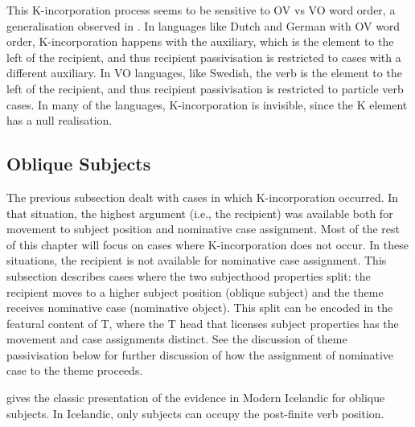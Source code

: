 {This K-incorporation process seems to be sensitive to OV vs VO word order, a generalisation observed in \cite{Sprouse.1995}. In languages like Dutch and German with OV word order, K-incorporation happens with the auxiliary, which is the element to the left of the recipient, and thus recipient passivisation is restricted to cases with a different auxiliary. In VO languages, like Swedish, the verb is the element to the left of the recipient, and thus recipient passivisation is restricted to particle verb cases. In many of the languages, K-incorporation is invisible, since the K element has a null realisation.

\subsection{Oblique Subjects}
The previous subsection dealt with cases in which K-incorporation occurred. In that situation, the highest argument (i.e., the recipient) was available both for movement to subject position and nominative case assignment. Most of the rest of this chapter will focus on cases where K-incorporation does not occur. In these situations, the recipient is not available for nominative case assignment. This subsection describes cases where the two subjecthood properties split: the recipient moves to a higher subject position (oblique subject) and the theme receives nominative case (nominative object). This split can be encoded in the featural content of T, where the T head that licenses subject properties has the movement and case assignments distinct. See the discussion of theme passivisation below for further discussion of how the assignment of nominative case to the theme proceeds.

\cite{Zaenen.1985} gives the classic presentation of the evidence in Modern Icelandic for oblique subjects. In Icelandic, only subjects can occupy the post-finite verb position.

}
